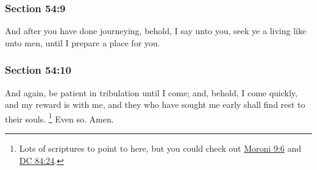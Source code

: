 	\subsubsection{Section 54:9} %
		\label{DC54-9}

		And after you have done journeying, behold, I say unto you, seek ye a living like unto men, until I prepare a place for you.


	\subsubsection{Section 54:10} %
		\label{DC54-10}

		And again, be patient in tribulation until I come; and, behold, I come quickly, and my reward is with me, and they who have sought me early shall find rest to their souls.%
			\footnote{%
				Lots of scriptures to point to here, but you could check out \hyperref[MORONI-9-6]{Moroni 9:6} and \hyperref[DC84-24]{DC 84:24}.
				}
		Even so.  Amen.

